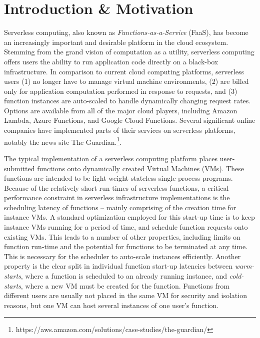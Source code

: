 \section{Introduction \& Motivation} \label{sec:intro}
 Serverless computing, also known as
\emph{Functions-as-a-Service} (FaaS), has become an increasingly important and
desirable platform in the cloud ecosystem. Stemming from the grand vision of
computation as a utility, serverless computing offers users the ability to run
application code directly on a black-box infrastructure. In comparison to
current cloud computing platforms, serverless users (1) no longer have to
manage virtual machine environments, (2) are billed only for application
computation performed in response to requests, and (3) function instances are
auto-scaled to handle dynamically changing request rates. Options are available
from all of the major cloud players, including Amazon Lambda, Azure Functions,
and Google Cloud Functions. Several significant online companies have
implemented parts of their services on serverless platforms, notably the news
site The
Guardian.\footnote{https://aws.amazon.com/solutions/case-studies/the-guardian/}.

 The typical implementation of a
serverless computing platform places user-submitted functions onto dynamically
created Virtual Machines (VMs). These functions are intended to be light-weight
stateless single-process programs. Because of the relatively short run-times of
serverless functions, a critical performance constraint in serverless
infrastructure implementations is the scheduling latency of functions -- mainly
comprising of the creation time for instance VMs. A standard optimization
employed for this start-up time is to keep instance VMs running for a period of
time, and schedule function requests onto existing VMs. This leads to a number
of other properties, including limits on function run-time and the potential
for functions to be terminated at any time. This is necessary for the scheduler
to auto-scale instances efficiently. Another property is the clear split in
individual function start-up latencies between \emph{warm-starts}, where a function
is scheduled to an already running instance, and \emph{cold-starts}, where a new VM
must be created for the function. Functions from different users are usually
not placed in the same VM for security and isolation reasons, but one VM can
host several instances of one user's function.

